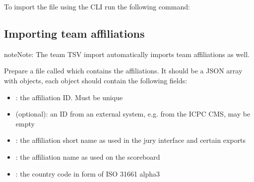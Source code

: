 \documentclass[a4paper,10pt,english,openany]{sphinxmanual}
\begin{document}
\begin{sphinxVerbatim}[commandchars=\\\{\}]
      
\end{sphinxVerbatim}

\sphinxAtStartPar
To import the file using the CLI run the following command:

\begin{sphinxVerbatim}[commandchars=\\\{\}]
      
\end{sphinxVerbatim}


\subsection{Importing team affiliations}
\label{\detokenize{import:importing-team-affiliations}}
\begin{sphinxadmonition}{note}{Note:}
\sphinxAtStartPar
The team TSV import automatically imports team affiliations as well.
\end{sphinxadmonition}

\sphinxAtStartPar
Prepare a file called  which contains the affiliations.
It should be a JSON array with objects, each object should contain the following
fields:
\begin{itemize}
\item {} 
\sphinxAtStartPar
{}: the affiliation ID. Must be unique

\item {} 
\sphinxAtStartPar
{} (optional): an ID from an external system, e.g. from the ICPC CMS, may be empty

\item {} 
\sphinxAtStartPar
{}: the affiliation short name as used in the jury interface and certain
exports

\item {} 
\sphinxAtStartPar
{}: the affiliation name as used on the scoreboard

\item {} 
\sphinxAtStartPar
{}: the country code in form of ISO 3166\sphinxhyphen{}1 alpha\sphinxhyphen{}3

\end{itemize}
\end{document}
